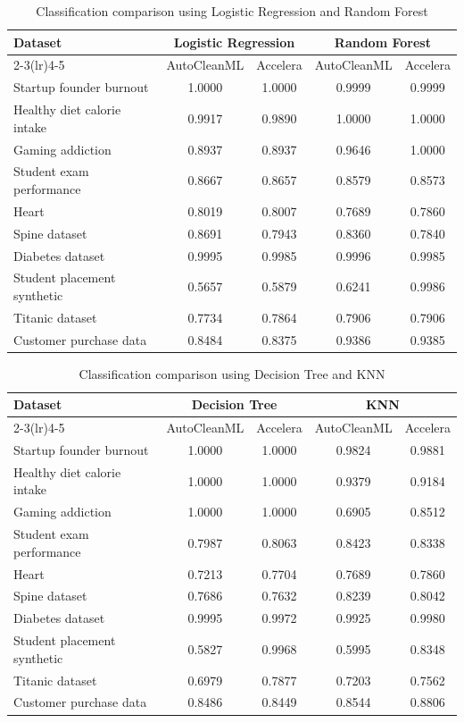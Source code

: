 \documentclass[12pt,a4paper]{report}
\begin{document}
\begin{table}[!htbp]
\centering
\small
\caption{Classification comparison using Logistic Regression and Random Forest}
\label{tab:classification-lr-rf-autoclean-accelera}
\begin{tabular}{p{}cccc}
\toprule
Dataset & \multicolumn{2}{c}{Logistic Regression} & \multicolumn{2}{c}{Random Forest} \\
\cmidrule(lr){2-3}\cmidrule(lr){4-5}
 & AutoCleanML & Accelera & AutoCleanML & Accelera \\
\midrule
Startup founder burnout & 1.0000 & 1.0000 & 0.9999 & 0.9999 \\
Healthy diet calorie intake & 0.9917 & 0.9890 & 1.0000 & 1.0000 \\
Gaming addiction & 0.8937 & 0.8937 & 0.9646 & 1.0000 \\
Student exam performance & 0.8667 & 0.8657 & 0.8579 & 0.8573 \\
Heart & 0.8019 & 0.8007 & 0.7689 & 0.7860 \\
Spine dataset & 0.8691 & 0.7943 & 0.8360 & 0.7840 \\
Diabetes dataset & 0.9995 & 0.9985 & 0.9996 & 0.9985 \\
Student placement synthetic & 0.5657 & 0.5879 & 0.6241 & 0.9986 \\
Titanic dataset & 0.7734 & 0.7864 & 0.7906 & 0.7906 \\
Customer purchase data & 0.8484 & 0.8375 & 0.9386 & 0.9385 \\
\bottomrule
\end{tabular}
\end{table}

\begin{table}[!htbp]
\centering
\small
\caption{Classification comparison using Decision Tree and KNN}
\label{tab:classification-dt-knn-autoclean-accelera}
\begin{tabular}{p{}cccc}
\toprule
Dataset & \multicolumn{2}{c}{Decision Tree} & \multicolumn{2}{c}{KNN} \\
\cmidrule(lr){2-3}\cmidrule(lr){4-5}
 & AutoCleanML & Accelera & AutoCleanML & Accelera \\
\midrule
Startup founder burnout & 1.0000 & 1.0000 & 0.9824 & 0.9881 \\
Healthy diet calorie intake & 1.0000 & 1.0000 & 0.9379 & 0.9184 \\
Gaming addiction & 1.0000 & 1.0000 & 0.6905 & 0.8512 \\
Student exam performance & 0.7987 & 0.8063 & 0.8423 & 0.8338 \\
Heart & 0.7213 & 0.7704 & 0.7689 & 0.7860 \\
Spine dataset & 0.7686 & 0.7632 & 0.8239 & 0.8042 \\
Diabetes dataset & 0.9995 & 0.9972 & 0.9925 & 0.9980 \\
Student placement synthetic & 0.5827 & 0.9968 & 0.5995 & 0.8348 \\
Titanic dataset & 0.6979 & 0.7877 & 0.7203 & 0.7562 \\
Customer purchase data & 0.8486 & 0.8449 & 0.8544 & 0.8806 \\
\bottomrule
\end{tabular}
\end{table}
\end{document}
